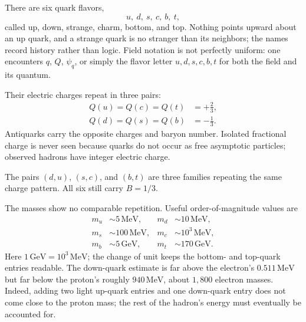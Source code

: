 There are six quark flavors,
\begin{equation}
u,\ d,\ s,\ c,\ b,\ t,
\end{equation}
called up, down, strange, charm, bottom, and top. Nothing points upward about an up quark, and a strange quark is no stranger than its neighbors; the names record history rather than logic. Field notation is not perfectly uniform: one encounters \(q\), \(Q\), \(\psi_q\), or simply the flavor letter \(u,d,s,c,b,t\) for both the field and its quantum.

\begin{classroomqa}
\end{classroomqa}

Their electric charges repeat in three pairs:
\begin{equation}
\begin{aligned}
Q(u)=Q(c)=Q(t)&=+\frac23,
\\
Q(d)=Q(s)=Q(b)&=-\frac13.
\end{aligned}
\end{equation}
Antiquarks carry the opposite charges and baryon number. Isolated fractional charge is never seen because quarks do not occur as free asymptotic particles; observed hadrons have integer electric charge.

The pairs \((d,u)\), \((s,c)\), and \((b,t)\) are three families repeating the same charge pattern. All six still carry \(B=1/3\).

\begin{classroomqa}
\end{classroomqa}

The masses show no comparable repetition. Useful order-of-magnitude values are
\begin{align}
m_u &\sim 5\,\mathrm{MeV},
&
m_d &\sim 10\,\mathrm{MeV},
\\
m_s &\sim 100\,\mathrm{MeV},
&
m_c &\sim 10^3\,\mathrm{MeV},
\\
m_b &\sim 5\,\mathrm{GeV},
&
m_t &\sim 170\,\mathrm{GeV}.
\end{align}
Here \(1\,\mathrm{GeV}=10^3\,\mathrm{MeV}\); the change of unit keeps the bottom- and top-quark entries readable. The down-quark estimate is far above the electron's \(0.511\,\mathrm{MeV}\) but far below the proton's roughly \(940\,\mathrm{MeV}\), about \(1{,}800\) electron masses. Indeed, adding two light up-quark entries and one down-quark entry does not come close to the proton mass; the rest of the hadron's energy must eventually be accounted for.

